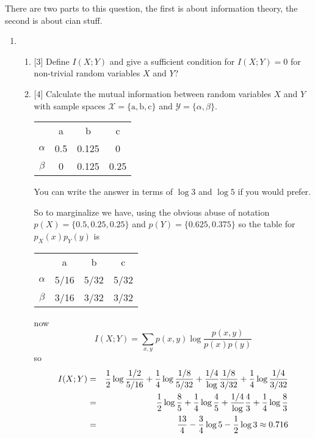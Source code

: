 \documentclass{article}
\newif\ifanswer
\begin{document}
\item There are two parts to this question, the first is about information theory, the second is about cian stuff.
  \begin{enumerate}
  \item{}


\begin{enumerate}
\item{}[3] Define $I(X;Y)$ and give a sufficient condition for $I(X;Y)=0$ for non-trivial random variables $X$ and $Y$?
  \ifanswer
  \begin{equation}
  I(X;Y)=\sum_{x,y}p(x,y)\log{\frac{p(x,y)}{p(x)p(y)}}
  \end{equation}
  and this is zero if the argument of the log is zero, that is $p(x,y)=p(x)p(y)$ for all $x$ and $y$, that is when $X$ and $Y$ are independent.
  \fi
\item{}[4]
 Calculate the mutual information between random variables $X$ and $Y$ with sample spaces $\mathcal{X}=\{\mbox{a},\mbox{b},\mbox{c}\}$ and $\mathcal{Y}=\{\alpha,\beta\}$.
  \begin{center}
  \begin{tabular}{c|ccc}
    \hline
    &\mbox{a}&\mbox{b}&\mbox{c}\\
    $\alpha$&0.5&0.125&0\\
    $\beta$&0&0.125&0.25
    \end{tabular}
  \end{center}
You can write the answer in terms of $\log{3}$ and $\log{5}$ if you would prefer.
  
  \ifanswer
So to marginalize we have, using the obvious abuse of notation $p(X)=\{0.5,0.25,0.25\}$ and $p(Y)=\{0.625,0.375\}$ so the table for $p_X(x)p_Y(y)$ is
  \begin{center}
  \begin{tabular}{c|ccc}
    \hline
    &\mbox{a}&\mbox{b}&\mbox{c}\\
    $\alpha$&5/16&5/32&5/32\\
    $\beta$&3/16&3/32&3/32
    \end{tabular}
  \end{center}
  now
  \begin{equation}
    I(X;Y)=\sum_{x,y}p(x,y)\log{\frac{p(x,y)}{p(x)p(y)}}
  \end{equation}
  so
  \begin{eqnarray}
    I(X;Y)&=&\frac{1}{2}\log{\frac{1/2}{5/16}}+\frac{1}{4}\log{\frac{1/8}{5/32}}+\frac{1/4}\log{\frac{1/8}{3/32}}+\frac{1}{4}\log{\frac{1/4}{3/32}}\cr
    &=&\frac{1}{2}\log{\frac{8}{5}}+\frac{1}{4}\log{\frac{4}{5}}+\frac{1/4}\log{\frac{4}{3}}+\frac{1}{4}\log{\frac{8}{3}}\cr
    &=&\frac{13}{4}-\frac{3}{4}\log{5}-\frac{1}{2}\log{3}\approx 0.716
  \end{eqnarray}


\end{enumerate}
\end{enumerate}
\end{document}
